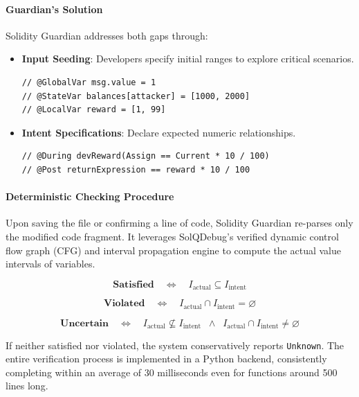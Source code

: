 \documentclass[pdflatex,sn-basic]{sn-jnl}%
\theoremstyle{thmstyleone}%
\theoremstyle{thmstyletwo}%
\theoremstyle{thmstylethree}%
\begin{document}
\paragraph{Guardian's Solution}
Solidity Guardian addresses both gaps through:
\begin{itemize}
    \item \textbf{Input Seeding}: Developers specify initial ranges to explore critical scenarios.
    \begin{lstlisting}[language=Solidity]
// @GlobalVar msg.value = 1
// @StateVar balances[attacker] = [1000, 2000]
// @LocalVar reward = [1, 99]
    \end{lstlisting}

    \item \textbf{Intent Specifications}: Declare expected numeric relationships.
    \begin{lstlisting}[language=Solidity]
// @During devReward(Assign == Current * 10 / 100)
// @Post returnExpression == reward * 10 / 100
    \end{lstlisting}
\end{itemize}

\paragraph{Deterministic Checking Procedure}
Upon saving the file or confirming a line of code, Solidity Guardian re-parses only the modified code fragment. It leverages SolQDebug's verified dynamic control flow graph (CFG) and interval propagation engine to compute the actual value intervals of variables.

\[
  \textbf{Satisfied} \quad \Longleftrightarrow \quad
    I_{\text{actual}} \subseteq I_{\text{intent}}
\]

\[
  \textbf{Violated} \quad \Longleftrightarrow \quad
    I_{\text{actual}} \cap I_{\text{intent}} = \varnothing
\]

\[
  \textbf{Uncertain} \quad \Longleftrightarrow \quad
    I_{\text{actual}} \not\subseteq I_{\text{intent}}
    \;\;\wedge\;\; I_{\text{actual}} \cap I_{\text{intent}} \neq \varnothing
\]

If neither satisfied nor violated, the system conservatively reports \texttt{Unknown}.  
The entire verification process is implemented in a Python backend, consistently completing within an average of 30 milliseconds even for functions around 500 lines long.
\end{document}
